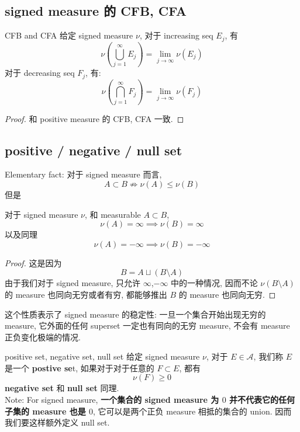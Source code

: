 \documentclass[lang=cn,11pt]{elegantbook}
\begin{document}
\subsection{signed measure 的 CFB, CFA }
\begin{proposition}{CFB and CFA}
给定 signed measure $\nu$,   对于 increasing seq $E_j$, 有 \[
\nu(\bigcup_{j=1}^\infty E_j)  = \lim_{j\to \infty} \nu(E_j) 
\]
对于 decreasing seq $F_j$, 有: \[
\nu(\bigcap_{j=1}^\infty F_j)  = \lim_{j\to \infty} \nu(F_j) 
\]
\end{proposition}
\begin{proof}
    和 positive measure 的 CFB, CFA 一致.
\end{proof}

\subsection{positive / negative / null set}

Elementary fact: 对于 signed measure 而言, \[
A \subset B \not \Longrightarrow \nu(A) \leq \nu (B)
\]
但是
\begin{lemma}
对于 signed measure $\nu$, 和 measurable $A \subset B$, 
\[
\nu(A) = \infty \implies \nu(B) = \infty
\]以及同理 \[
\nu(A) = -\infty \implies \nu(B) = - \infty
\]
\end{lemma}
\begin{proof}
    这是因为 \[
B = A \sqcup (B \setminus A)
\]
由于我们对于 signed measure, 只允许 $\infty$,$-\infty$ 中的一种情况, 因而不论 $\nu(B \setminus A)$ 的 measure 也同向无穷或者有穷, 都能够推出 $B$ 的 measure 也同向无穷.
\end{proof}
\begin{remark}
    这个性质表示了 signed measure 的稳定性: 一旦一个集合开始出现无穷的 measure, 它外面的任何 superset 一定也有同向的无穷 measure, 不会有 measure 正负变化极端的情况.
\end{remark}
 

\begin{definition}{positive set, negative set, null set}
    给定 signed measure $\nu$, 对于 $E \in \mathcal{A}$, 我们称 $E$ 是一个 \textbf{postive se}t, 如果对于对于任意的 $F \subset E$, 都有 \[
    \nu(F) \geq 0
    \] \textbf{negative set} 和 \textbf{null set} 同理.\\
Note: For signed measure,\textbf{ 一个集合的 signed measure 为 $0$ 并不代表它的任何子集的 measure 也是 $0$}, 它可以是两个正负 measure 相抵的集合的 union. 因而我们要这样额外定义 null set.
\end{definition}
\end{document}
